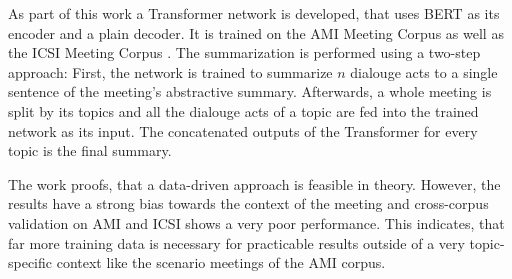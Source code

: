 As part of this work a Transformer network \cite{1706.03762} is developed, that uses BERT as its encoder and a plain decoder.
It is trained on the AMI Meeting Corpus \cite{Mccowan05theami} as well as the ICSI Meeting Corpus \cite{Janin}.
The summarization is performed using a two-step approach:
First, the network is trained to summarize \(n\) dialouge acts to a single sentence of the meeting's abstractive summary.
Afterwards, a whole meeting is split by its topics and all the dialouge acts of a topic are fed into the trained network as its input.
The concatenated outputs of the Transformer for every topic is the final summary.

The work proofs, that a data-driven approach is feasible in theory.
However, the results have a strong bias towards the context of the meeting and cross-corpus validation on AMI and ICSI shows a very poor performance.
This indicates, that far more training data is necessary for practicable results outside of a very topic-specific context like the scenario meetings of the AMI corpus. 
